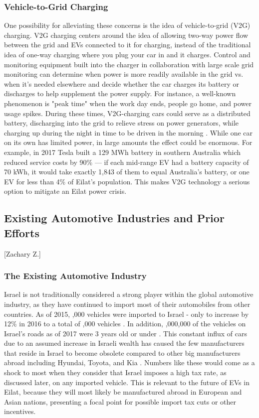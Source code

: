 \documentclass[12pt]{article}                         %
\begin{document}
\subsubsection{Vehicle-to-Grid Charging}
One possibility for alleviating these concerns is the idea of vehicle-to-grid (V2G) charging. V2G charging centers around the idea of allowing two-way power flow between the grid and EVs connected to it for charging, instead of the traditional idea of one-way charging where you plug your car in and it charges. Control and monitoring equipment built into the charger in collaboration with large scale grid monitoring can determine when power is more readily available in the grid vs. when it's needed elsewhere and decide whether the car charges its battery or discharges to help supplement the power supply. For instance, a well-known phenomenon is "peak time" when the work day ends, people go home, and power usage spikes. During these times, V2G-charging cars could serve as a distributed battery, discharging into the grid to relieve stress on power generators, while charging up during the night in time to be driven in the morning \cite{Mahmud2015PowerEV}. While one car on its own has limited power, in large amounts the effect could be enormous. For example, in 2017 Tesla built a 129 MWh battery in southern Australia which reduced service costs by 90\% \cite{Lambert2018Teslas90} --- if each mid-range EV had a battery capacity of 70 kWh, it would take exactly 1,843 of them to equal Australia's battery, or one EV for less than 4\% of Eilat's population. This makes V2G technology a serious option to mitigate an Eilat power crisis.

\subsection{Existing Automotive Industries and Prior Efforts}[Zachary Z.]
\subsubsection{The Existing Automotive Industry}
Israel is not traditionally considered a strong player within the global automotive industry, as they have continued to import most of their automobiles from other countries. As of 2015, ,000 vehicles were imported to Israel - only to increase by 12\% in 2016 to a total of ,000 vehicles \cite{Halavy20172016Imports}. In addition, ,000,000 of the vehicles on Israel's roads as of 2017 were 3 years old or under \cite{Halavy20172016Imports}. This constant influx of cars due to an assumed increase in Israeli wealth has caused the few manufacturers that reside in Israel to become obsolete compared to other big manufacturers abroad including Hyundai, Toyota, and Kia \cite{CarLoanWorld2015TheAustrailia}. Numbers like these would come as a shock to most when they consider that Israel imposes a high tax rate, as discussed later, on any imported vehicle. This is relevant to the future of EVs in Eilat, because they will most likely be manufactured abroad in European and Asian nations, presenting a focal point for possible import tax cuts or other incentives.
\end{document}
